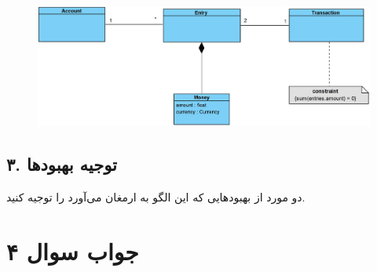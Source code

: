 \begin{figure}[h]
	\centering
	\includegraphics{pic2.jpg}
	\label{fig:label4}
\end{figure}

\subsection*{۳. توجیه بهبود‌ها}
دو مورد از بهبود‌هایی که این الگو به ارمغان می‌آورد را توجیه کنید.

\section*{جواب سوال ۴}

